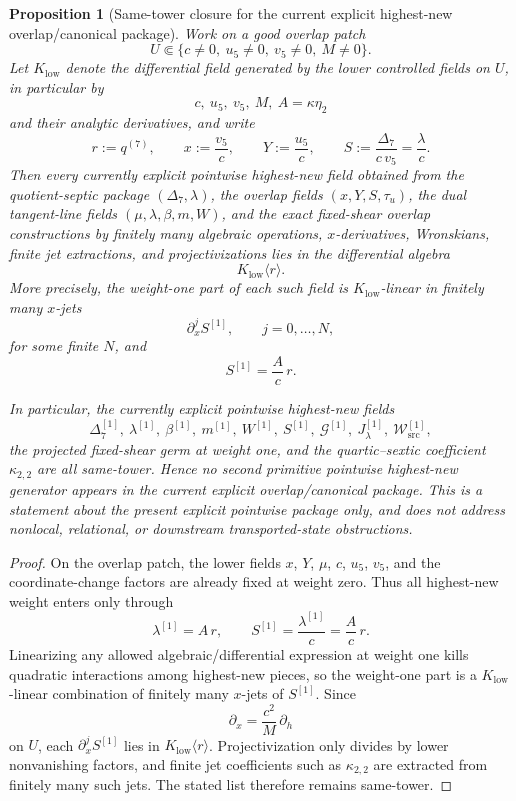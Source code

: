 \documentclass[11pt,a4paper]{amsart}
\theoremstyle{plain}
\newtheorem{proposition}[theorem]{Proposition}
\theoremstyle{definition}
\begin{document}
\begin{proposition}[Same-tower closure for the current explicit highest-new overlap/canonical package]
\label{prop:same-tower-closure-current-explicit-highest-new-overlap-canonical-package}
Work on a good overlap patch
\[
U\Subset\{c\neq 0,\ u_5\neq 0,\ v_5\neq 0,\ M\neq 0\}.
\]
Let $K_{\mathrm{low}}$ denote the differential field generated by the lower
controlled fields on $U$, in particular by
\[
c,\ u_5,\ v_5,\ M,\ A=\kappa\eta_2
\]
and their analytic derivatives, and write
\[
r:=q^{(7)},
\qquad
x:=\frac{v_5}{c},
\qquad
Y:=\frac{u_5}{c},
\qquad
S:=\frac{\Delta_7}{c\,v_5}=\frac{\lambda}{c}.
\]
Then every currently explicit pointwise highest-new field obtained from the
quotient-septic package $(\Delta_7,\lambda)$, the overlap fields
$(x,Y,S,\tau_u)$, the dual tangent-line fields $(\mu,\lambda,\beta,m,W)$, and
the exact fixed-shear overlap constructions by finitely many algebraic
operations, $x$-derivatives, Wronskians, finite jet extractions, and
projectivizations lies in the differential algebra
\[
K_{\mathrm{low}}\langle r\rangle.
\]
More precisely, the weight-one part of each such field is
$K_{\mathrm{low}}$-linear in finitely many $x$-jets
\[
\partial_x^j S^{[1]},
\qquad
j=0,\dots,N,
\]
for some finite $N$, and
\[
S^{[1]}=\frac{A}{c}\,r.
\]

In particular, the currently explicit pointwise highest-new fields
\[
\Delta_7^{[1]},\ \lambda^{[1]},\ \beta^{[1]},\ m^{[1]},\ W^{[1]},\
S^{[1]},\ \mathcal G^{[1]},\ J_\lambda^{[1]},\ \mathcal W_{\mathrm{src}}^{[1]},
\]
the projected fixed-shear germ at weight one, and the quartic--sextic
coefficient $\kappa_{2,2}$ are all same-tower. Hence no second primitive
pointwise highest-new generator appears in the current explicit
overlap/canonical package. This is a statement about the present explicit
pointwise package only, and does not address nonlocal, relational, or
downstream transported-state obstructions.
\end{proposition}

\begin{proof}
On the overlap patch, the lower fields $x$, $Y$, $\mu$, $c$, $u_5$, $v_5$, and
the coordinate-change factors are already fixed at weight zero. Thus all
highest-new weight enters only through
\[
\lambda^{[1]}=A\,r,
\qquad
S^{[1]}=\frac{\lambda^{[1]}}{c}=\frac{A}{c}\,r.
\]
Linearizing any allowed algebraic/differential expression at weight one kills
quadratic interactions among highest-new pieces, so the weight-one part is a
$K_{\mathrm{low}}$-linear combination of finitely many $x$-jets of $S^{[1]}$.
Since
\[
\partial_x=\frac{c^2}{M}\,\partial_h
\]
on $U$, each $\partial_x^jS^{[1]}$ lies in $K_{\mathrm{low}}\langle r\rangle$.
Projectivization only divides by lower nonvanishing factors, and finite jet
coefficients such as $\kappa_{2,2}$ are extracted from finitely many such jets.
The stated list therefore remains same-tower.
\end{proof}
\end{document}
